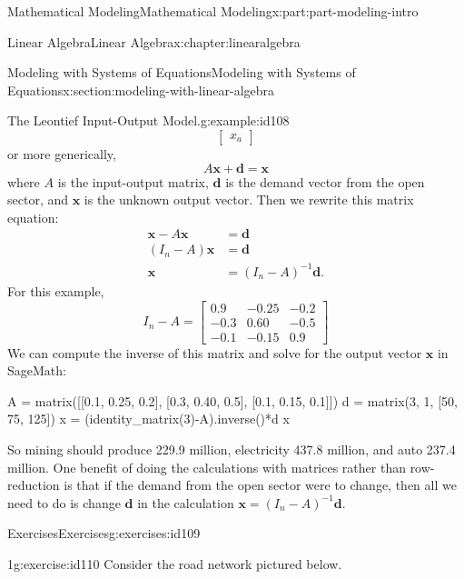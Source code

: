 \documentclass[oneside,10pt,]{book}
\numberwithin{equation}{section}
\begin{document}
\begin{partptx}{Mathematical Modeling}{}{Mathematical Modeling}{}{}{x:part:part-modeling-intro}
\begin{chapterptx}{Linear Algebra}{}{Linear Algebra}{}{}{x:chapter:linearalgebra}
\begin{sectionptx}{Modeling with Systems of Equations}{}{Modeling with Systems of Equations}{}{}{x:section:modeling-with-linear-algebra}
\begin{example}{The Leontief Input-Output Model.}{g:example:id108}
\begin{equation*}
\begin{bmatrix}
x_a
\end{bmatrix}
\end{equation*}
or more generically,%
%
\begin{equation*}
A\pmb{x}+\pmb{d} = \pmb{x}
\end{equation*}
where \(A\) is the input-output matrix, \(\pmb{d}\) is the demand vector from the open sector, and \(\pmb{x}\) is the unknown output vector. Then we rewrite this matrix equation:%
%
\begin{equation*}
\begin{aligned}
\pmb{x} - A\pmb{x} &= \pmb{d} \\
(I_n - A)\pmb{x} &= \pmb{d} \\
\pmb{x} &=(I_n-A)^{-1}\pmb{d}.
\end{aligned}
\end{equation*}
For this example,%
%
\begin{equation*}
I_n - A = \begin{bmatrix}
0.9 & -0.25 & -0.2 \\
-0.3 & 0.60 & -0.5 \\
-0.1 & -0.15 & 0.9
\end{bmatrix}
\end{equation*}
We can compute the inverse of this matrix and solve for the output vector \(\pmb{x}\) in SageMath:%
\begin{sageinput}
A = matrix([[0.1, 0.25, 0.2], [0.3, 0.40, 0.5], [0.1, 0.15, 0.1]])
d = matrix(3, 1, [50, 75, 125])
x = (identity_matrix(3)-A).inverse()*d
x
\end{sageinput}
\begin{sageoutput}
[229.921259842520]
[437.795275590551]
[237.401574803150]
\end{sageoutput}
So mining should produce \textdollar{}229.9 million, electricity \textdollar{}437.8 million, and auto \textdollar{}237.4 million. One benefit of doing the calculations with matrices rather than row-reduction is that if the demand from the open sector were to change, then all we need to do is change \(\pmb{d}\) in the calculation \(\pmb{x} = (I_n - A)^{-1} \pmb{d}\).%
\end{example}
%
%
\typeout{************************************************}
\typeout{************************************************}
%
\begin{exercises-subsection-numberless}{Exercises}{}{Exercises}{}{}{g:exercises:id109}
\begin{divisionexercise}{1}{}{}{g:exercise:id110}%
Consider the road network pictured below.%

\end{divisionexercise}
\end{exercises-subsection-numberless}
\end{sectionptx}
\end{chapterptx}
\end{partptx}
\end{document}
